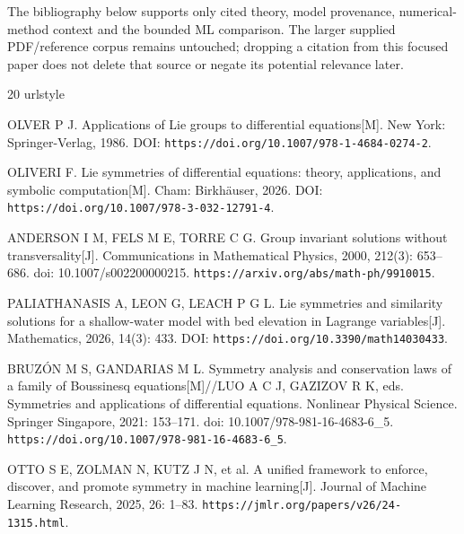 \documentclass[11pt]{article}
\theoremstyle{definition}
\begin{document}
The bibliography below supports only cited theory, model provenance,
numerical-method context and the bounded ML comparison. The larger supplied
PDF/reference corpus remains untouched; dropping a citation from this focused
paper does not delete that source or negate its potential relevance later.

\clearpage
\begingroup
\small
\setlength{\bibsep}{4pt plus 1pt minus 1pt}
\begin{thebibliography}{20}
\providecommand{\natexlab}[1]{#1}
\providecommand{\url}[1]{\texttt{#1}}
\expandafter\ifx\csname urlstyle\endcsname\relax
  \providecommand{\doi}[1]{doi: #1}\else
  \providecommand{\doi}{doi: \begingroup \urlstyle{rm}\Url}\fi

OLVER P J. Applications of Lie groups to differential equations[M].
New York: Springer-Verlag, 1986.
DOI: \url{https://doi.org/10.1007/978-1-4684-0274-2}.

OLIVERI F. Lie symmetries of differential equations: theory, applications,
and symbolic computation[M]. Cham: Birkh\"auser, 2026.
DOI: \url{https://doi.org/10.1007/978-3-032-12791-4}.

ANDERSON I M, FELS M E, TORRE C G. Group invariant solutions without
transversality[J]. Communications in Mathematical Physics, 2000,
212(3): 653--686.
\doi{10.1007/s002200000215}.
\url{https://arxiv.org/abs/math-ph/9910015}.

PALIATHANASIS A, LEON G, LEACH P G L. Lie symmetries and similarity
solutions for a shallow-water model with bed elevation in Lagrange variables[J].
Mathematics, 2026, 14(3): 433.
DOI: \url{https://doi.org/10.3390/math14030433}.

BRUZ\'{O}N M S, GANDARIAS M L. Symmetry analysis and conservation laws
of a family of Boussinesq equations[M]//LUO A C J, GAZIZOV R K, eds.
Symmetries and applications of differential equations. Nonlinear Physical
Science. Springer Singapore, 2021: 153--171.
\doi{10.1007/978-981-16-4683-6_5}.
\url{https://doi.org/10.1007/978-981-16-4683-6_5}.

OTTO S E, ZOLMAN N, KUTZ J N, et al. A unified framework to enforce,
discover, and promote symmetry in machine learning[J]. Journal of Machine
Learning Research, 2025, 26: 1--83.
\url{https://jmlr.org/papers/v26/24-1315.html}.


\end{thebibliography}
\end{document}
